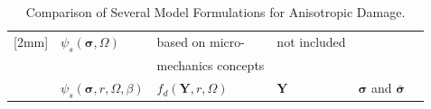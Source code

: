 \documentclass[preprint,review,12pt]{elsarticle}
\begin{document}
\begin{table}
{\begin{tabular}{p{1.5cm}|l@{}|p{3.5cm}|l|p{2.3cm}|p{2cm}}
[2mm] \hline
     {\scriptsize\cite{Shao2005,Shao2006,Zhou2006}}
  &  \footnotesize{$\psi_s(\bm\sigma,\bm\varOmega)$}
  &  \footnotesize{based on micro-}
  &  \footnotesize{not included}
  &  &
\\
  &
  &  \footnotesize{mechanics concepts}
  & & &
\\
[2mm] \hline
     {\scriptsize\cite{Hayakawa1997}}
  &  \footnotesize{$\psi_s(\bm\sigma,r,\bm\varOmega,\beta)$}
  &  \footnotesize{$f_d(\bm{Y},r,\bm\varOmega)$}
  &  \footnotesize{$\bm{Y}$}
  &  \footnotesize{$\bm\sigma$ and $\bar{\bm\sigma}$}
  &
\\
[2mm] \hline
\end{tabular}}%
\caption{Comparison of Several Model Formulations for Anisotropic Damage.}
\label{aniso_models}%
\end{table}
\end{document}
